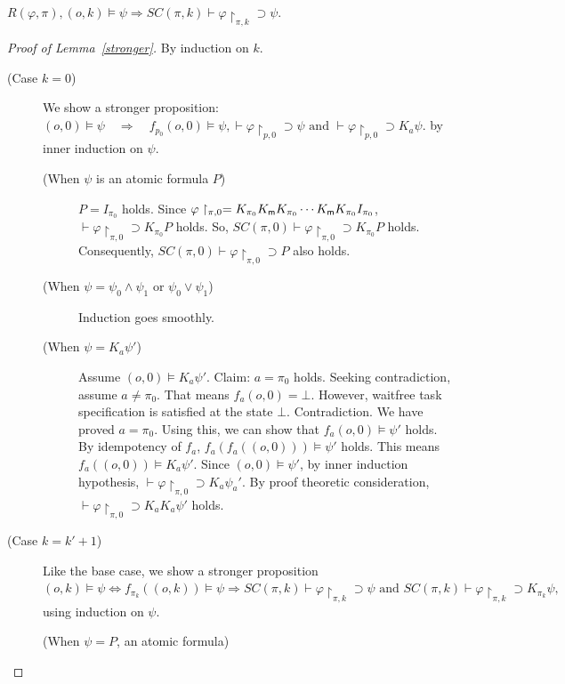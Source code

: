 \begin{lemma}
 \label{stronger}
 $R(\varphi, \pi), (o,k)\models \psi\Longrightarrow SC(\pi, k)\vdash
 \varphi\restriction_{\pi,k}\supset\psi$.
\end{lemma}
\begin{proof}[Proof of Lemma~\ref{stronger}]
 By induction on $k$.
\begin{description}
 \item[(Case $k=0$)] 
 We show a stronger proposition:
$
 (o,0)\models \psi \quad\Longrightarrow\quad f_{p_0}(o,0)\models \psi,
 \vdash \varphi\restriction_{p,0}\supset \psi
 \mbox{ and }
 \vdash \varphi\restriction_{p,0}\supset K_a\psi.
$
by inner induction on $\psi$.
\begin{description}
 \item[(When $\psi$ is an atomic formula $P$)] 
 $P = I_{\pi_0}$ holds.
 Since $\varphi\restriction_{\pi,0} = K_{\pi_0}K_{\sf m} K_{\pi_0}\cdots K_{\sf m} K_{\pi_0}I_{\pi_0}$,
 $\vdash\varphi\restriction_{\pi,0}\supset K_{\pi_0}P$ holds.
 So, $SC(\pi,0)\vdash \varphi\restriction_{\pi,0}\supset K_{\pi_0}P$ holds.
 Consequently, $SC(\pi,0)\vdash \varphi\restriction_{\pi,0}\supset P$ also holds.
 \item[(When $\psi = \psi_0\wedge \psi_1$ or $\psi_0\vee\psi_1$)] 
 Induction goes smoothly.
 \item[(When $\psi = K_a\psi'$)]
 Assume $(o,0)\models K_a\psi'$. Claim: $a=\pi_0$ holds.
 Seeking contradiction, assume $a\neq \pi_0$.
 That means $f_a(o,0) = \bot$.
 However, waitfree task specification is satisfied at the state $\bot$.
 Contradiction.
 We have proved $a=\pi_0$. Using this, we can show that $f_a(o,0)\models\psi'$ holds.
 By idempotency of $f_a$, $f_a(f_a((o,0)))\models \psi'$ holds.
 This means $f_a((o,0))\models K_a\psi'$.
 Since $(o,0)\models \psi'$, by inner induction hypothesis,
 $\vdash \varphi\restriction_{\pi,0}\supset K_a\psi_a'$.
 By proof theoretic consideration,
 $\vdash \varphi\restriction_{\pi,0}\supset K_a K_a\psi'$ holds.
\end{description}
 \item[(Case $k = k' + 1$)]
 Like the base case, we show a stronger proposition
$
 (o,k)\models \psi\Leftrightarrow f_{\pi_k}((o,k))\models \psi \Rightarrow SC(\pi,k)\vdash
 \varphi\restriction_{\pi,k}\supset \psi\mbox{ and }SC(\pi,k)\vdash
 \varphi\restriction_{\pi,k}\supset K_{\pi_k}\psi, 
$
using induction on $\psi$.
\begin{description}
 \item[(When $\psi = P$, an atomic formula)] 

\end{description}
\end{description}
\end{proof}
